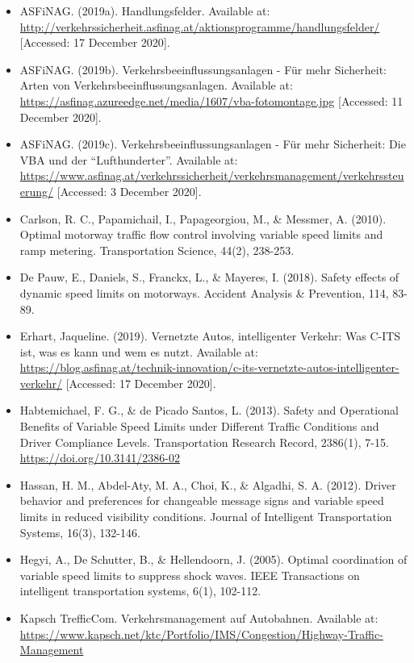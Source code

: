 \documentclass[
]{book}
\providecommand{\tightlist}{%
  \setlength{\itemsep}{0pt}\setlength{\parskip}{0pt}}
\begin{document}
\begin{itemize}
\tightlist
\item
  ASFiNAG. (2019a). Handlungsfelder. Available at: \url{http://verkehrssicherheit.asfinag.at/aktionsprogramme/handlungsfelder/} {[}Accessed: 17 December 2020{]}.
\item
  ASFiNAG. (2019b). Verkehrsbeeinflussungsanlagen - Für mehr Sicherheit: Arten von Verkehrsbeeinflussungsanlagen. Available at: \url{https://asfinag.azureedge.net/media/1607/vba-fotomontage.jpg} {[}Accessed: 11 December 2020{]}.
\item
  ASFiNAG. (2019c). Verkehrsbeeinflussungsanlagen - Für mehr Sicherheit: Die VBA und der ``Lufthunderter''. Available at: \url{https://www.asfinag.at/verkehrssicherheit/verkehrsmanagement/verkehrssteuerung/} {[}Accessed: 3 December 2020{]}.
\item
  Carlson, R. C., Papamichail, I., Papageorgiou, M., \& Messmer, A. (2010). Optimal motorway traffic flow control involving variable speed limits and ramp metering. Transportation Science, 44(2), 238-253.
\item
  De Pauw, E., Daniels, S., Franckx, L., \& Mayeres, I. (2018). Safety effects of dynamic speed limits on motorways. Accident Analysis \& Prevention, 114, 83-89.
\item
  Erhart, Jaqueline. (2019). Vernetzte Autos, intelligenter Verkehr: Was C-ITS ist, was es kann und wem es nutzt. Available at: \url{https://blog.asfinag.at/technik-innovation/c-its-vernetzte-autos-intelligenter-verkehr/} {[}Accessed: 17 December 2020{]}.
\item
  Habtemichael, F. G., \& de Picado Santos, L. (2013). Safety and Operational Benefits of Variable Speed Limits under Different Traffic Conditions and Driver Compliance Levels. Transportation Research Record, 2386(1), 7-15. \url{https://doi.org/10.3141/2386-02}
\item
  Hassan, H. M., Abdel-Aty, M. A., Choi, K., \& Algadhi, S. A. (2012). Driver behavior and preferences for changeable message signs and variable speed limits in reduced visibility conditions. Journal of Intelligent Transportation Systems, 16(3), 132-146.
\item
  Hegyi, A., De Schutter, B., \& Hellendoorn, J. (2005). Optimal coordination of variable speed limits to suppress shock waves. IEEE Transactions on intelligent transportation systems, 6(1), 102-112.
\item
  Kapsch TrefficCom. Verkehrsmanagement auf Autobahnen. Available at: \url{https://www.kapsch.net/ktc/Portfolio/IMS/Congestion/Highway-Traffic-Management}

\end{itemize}
\end{document}
